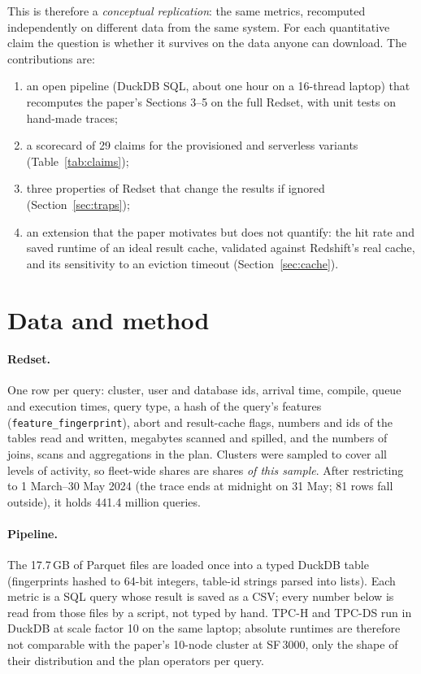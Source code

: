 \documentclass[10pt,a4paper]{article}
\begin{document}
This is therefore a \emph{conceptual replication}: the same metrics, recomputed independently on different data from the same system. For each quantitative claim the question is whether it survives on the data anyone can download. The contributions are:
\begin{enumerate}\setlength{\itemsep}{0pt}
\item an open pipeline (DuckDB SQL, about one hour on a 16-thread laptop) that recomputes the paper's Sections 3--5 on the full Redset, with unit tests on hand-made traces;
\item a scorecard of 29 claims for the provisioned and serverless variants (Table~\ref{tab:claims});
\item three properties of Redset that change the results if ignored (Section~\ref{sec:traps});
\item an extension that the paper motivates but does not quantify: the hit rate and saved runtime of an ideal result cache, validated against Redshift's real cache, and its sensitivity to an eviction timeout (Section~\ref{sec:cache}).
\end{enumerate}

\section{Data and method}

\paragraph{Redset.} One row per query: cluster, user and database ids, arrival time, compile, queue and execution times, query type, a hash of the query's features (\texttt{feature\_fingerprint}), abort and result-cache flags, numbers and ids of the tables read and written, megabytes scanned and spilled, and the numbers of joins, scans and aggregations in the plan. Clusters were sampled to cover all levels of activity, so fleet-wide shares are shares \emph{of this sample}. After restricting to 1 March--30 May 2024 (the trace ends at midnight on 31 May; 81 rows fall outside), it holds 441.4 million queries.

\paragraph{Pipeline.} The 17.7\,GB of Parquet files are loaded once into a typed DuckDB table (fingerprints hashed to 64-bit integers, table-id strings parsed into lists). Each metric is a SQL query whose result is saved as a CSV; every number below is read from those files by a script, not typed by hand. TPC-H and TPC-DS run in DuckDB at scale factor 10 on the same laptop; absolute runtimes are therefore not comparable with the paper's 10-node cluster at SF\,3000, only the shape of their distribution and the plan operators per query.
\end{document}
